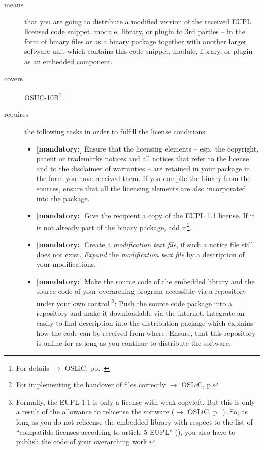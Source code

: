 \begin{description}
\item[means] that you are going to distribute a modified version of the received
EUPL licensed code snippet, module, library, or plugin to 3rd parties -- in the
form of binary files or as a binary package together with another larger
software unit which contains this code snippet, module, library, or plugin as an
embedded component.
\item[covers] OSUC-10B\footnote{For details $\rightarrow$ OSLiC, pp.\
\pageref{OSUC-10B-DEF}}
\item[requires] the following tasks in order to fulfill the license conditions:
\begin{itemize}
  
  
  \item \textbf{[mandatory:]} Ensure that the licensing elements -- esp.\ the
  copyright, patent or trademarks notices and all notices that refer to the
  license and to the disclaimer of warranties -- are retained in your package in
  the form you have received them. If you compile the binary from the sources,
  ensure that all the licensing elements are also incorporated into the package.
  
  \item \textbf{[mandatory:]} Give the recipient a copy of the EUPL 1.1
  license. If it is not already part of the binary package, add
  it\footnote{For implementing the handover of files correctly $\rightarrow$
  OSLiC, p. \pageref{DistributingFilesHint}}.
 
  \item \textbf{[mandatory:]} Create a \emph{modification text file}, if such a
  notice file still does not exist. \emph{Expand} the \emph{modification text
  file} by a description of your modifications.
  
  \item \textbf{[mandatory:]} Make the source code of the embedded library and
  the source code of your overarching program accessible via a repository under
  your own control \footnote{Formally, the EUPL-1.1 is only a license with weak
  copyleft. But this is only a result of the allowance to relicense the software
  ($\rightarrow$ OSLiC, p.\ \protectionpageref{EUPL}). So, as long as
  you do not relicense the embedded library with respect to the list of
  \enquote{compatible licenses accodring to article 5 EUPL} (\cite[cf.][\nopage
  wp §5 and Appendix]{EuplLicense2007en}), you also have to publish the code of
  your overarching work.}: Push the source code package into a repository and
  make it downloadable via the internet. Integrate an easily to find description
  into the distribution package which explains how the code can be received from
  where. Ensure, that this repository is online for as long as you continue to
  distribute the software.
  

\end{itemize}
\end{description}
